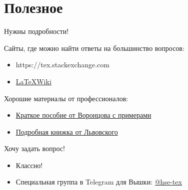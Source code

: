 \section{Полезное}


\begin{frame}{Нужны подробности!}

Сайты, где можно найти ответы на большинство вопросов:
\begin{itemize}
    \item {\color{blue} https://tex.stackexchange.com}
    \item \href{https://latex.wikia.org/wiki/Main_page}{\color{blue} \LaTeX \enspace Wiki}
\end{itemize}

Хорошие материалы от профессионалов:
\begin{itemize}
    \item \href{http://www.machinelearning.ru/wiki/images/e/e4/latex_examples.pdf}{\color{blue} Краткое пособие от Воронцова с примерами}
    \item \href{http://gidropraktikum.narod.ru/Lvovskii-2014.pdf}{\color{blue} Подробная книжка от Львовского}
\end{itemize}

\end{frame}


\begin{frame}{Хочу задать вопрос!}

\begin{itemize}
    \item Классно! 
    \item Специальная группа в Telegram для Вышки: \href{https://t.me/hsetexdisc}{\color{blue}@hse-tex}
\end{itemize}

\end{frame}
